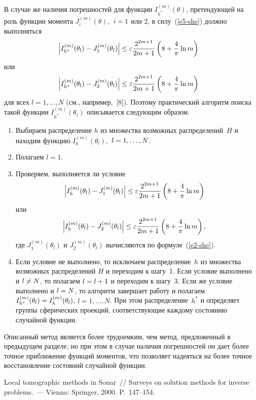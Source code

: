 \begin{multicols}{2}
В случае же наличия погрешностей для функции $I^{(m)}_{h^*}(\theta)$, претендующей на роль функции
момента $J^{(m)}_i(\theta),$ $i\hm=1$ или 2, в силу~(\ref{e5-she}) 
должно выполняться
$$
\left\vert I^{(m)}_{h^*}(\theta_l)-J^{(m)}_1(\theta_l)\right\vert\leq\varepsilon
\displaystyle\frac{\displaystyle 2^{2m+1}\mathstrut}{\displaystyle 2m+1\mathstrut}\left(8+\displaystyle\frac{\displaystyle 4\mathstrut}{\displaystyle \pi\mathstrut}\ln m\right)
$$
или
$$
\left\vert I^{(m)}_{h^*}(\theta_l)-J^{(m)}_2(\theta_l)\right\vert\leq\varepsilon
\displaystyle\frac{\displaystyle 2^{2m+1}\mathstrut}{\displaystyle 2m+1\mathstrut}\left(8+\displaystyle\frac{\displaystyle 4\mathstrut}{\displaystyle \pi\mathstrut}\ln m\right)
$$
для всех $l=1,\ldots,N$ (см., например,~[8]). Поэтому практический алгоритм поиска такой функции
$I^{(m)}_{h^*}(\theta_i)$ описывается следующим образом.
\begin{enumerate}[1.]
\item Выбираем распределение $h$ из множества возможных распределений~$H$ и 
находим функцию $I^{(m)}_{h}(\theta_l),$ $l\hm=1,\ldots,N$.
\item Полагаем $l=1$.
\item Проверяем, выполняется ли условие
$$\left\vert I^{(m)}_{h}(\theta_l)-J^{(m)}_1(\theta_l)\right\vert\leq\varepsilon
\displaystyle\frac{\displaystyle 2^{2m+1}\mathstrut}{\displaystyle 2m+1\mathstrut}\left(8+\displaystyle\frac{\displaystyle 4\mathstrut}{\displaystyle \pi\mathstrut}\ln m\right)
$$
или
$$
\left\vert I^{(m)}_{h}(\theta_l)-J^{(m)}_2(\theta_l)\right\vert\leq\varepsilon
\displaystyle\frac{\displaystyle 2^{2m+1}\mathstrut}{\displaystyle 2m+1\mathstrut}\left(8+\displaystyle\frac{\displaystyle 4\mathstrut}{\displaystyle \pi\mathstrut}\ln m\right),$$
где $J^{(m)}_1(\theta_l)$ и $J^{(m)}_2(\theta_l)$ вычисляются по формуле~(\ref{e2-she}).
\item Если условие не выполнено, то исключаем распределение~$h$
из множества возможных распределений $H$ и переходим к шагу~1.
Если условие выполнено и $l\hm\neq N$, то полагаем $l\hm=l+1$ и
переходим к шагу~3. Если же условие выполнено и $l\hm=N$, то алгоритм
завершает работу и полагаем
$I^{(m)}_{h^*}(\theta_l)\hm=I^{(m)}_{h}(\theta_l),$ $l=1,\ldots,N$.
При этом распределение~$h^*$ и определяет группы сферических проекций, 
соответствующие каждому состоянию случайной функции.
\end{enumerate}

Описанный метод является более трудоемким, чем метод, предложенный в
предыдущем разделе, но при этом в случае наличия погрешностей он дает
более точное приближение функций моментов, что позволяет надеяться
на более точное восстановление состояний случайной функции.

{\small\frenchspacing
{%
\begin{thebibliography}{99}

 Local tomographic methods in
Sonar~// Surveys on solution methods for inverse problems.~---
Vienna: Springer, 2000. P.~147--154.


\end{thebibliography}}}
\end{multicols}
